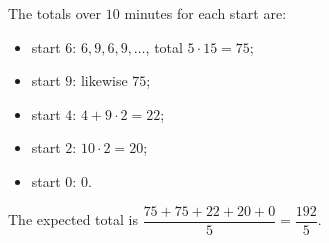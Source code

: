 The totals over $10$ minutes for each start are:
\begin{itemize}
\item start $6$: $6,9,6,9,\dots$, total $5\cdot15=75$;
\item start $9$: likewise $75$;
\item start $4$: $4+9\cdot2=22$;
\item start $2$: $10\cdot2=20$;
\item start $0$: $0$.
\end{itemize}
The expected total is $\dfrac{75+75+22+20+0}{5}=\boxed{\dfrac{192}5}$.
